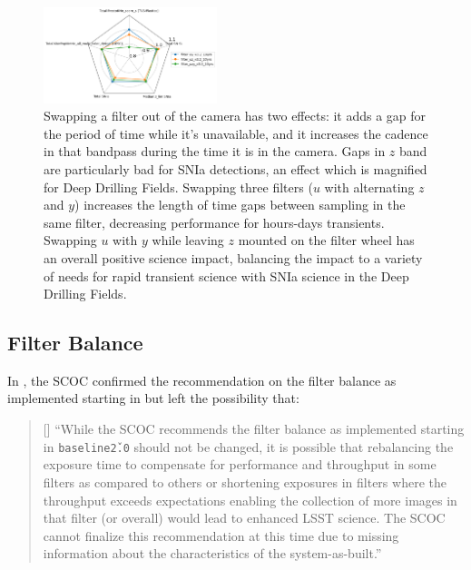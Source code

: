 \begin{figure}
\centering
\includegraphics[width=0.45\textwidth]{figures/filter_swap_KNe.png}
\caption{Swapping a filter out of the camera has two effects: it adds a gap for the period of time while it's unavailable, and it increases the cadence in that bandpass during the time it is in the camera. Gaps in $z$ band are particularly bad for SNIa detections, an effect which is magnified for Deep Drilling Fields. %
Swapping three filters ($u$ with alternating $z$ and $y$) increases the length of time gaps between sampling in the same filter, decreasing performance for hours-days transients.
Swapping $u$ with $y$ while leaving $z$ mounted on the filter wheel has an overall positive science impact, balancing the impact to a variety of needs for rapid transient science with SNIa science in the Deep Drilling Fields. }
\label{fig:swapping}
\end{figure}

\FloatBarrier
\subsection{Filter Balance}\label{sec:filterbalance}
 In , the SCOC confirmed the recommendation on the filter balance as implemented starting in  but left the possibility that:
  
 \begin{quote}[] ``While the SCOC recommends the filter balance as implemented starting in \texttt{baseline\v2.0} should not be changed, it is possible that rebalancing the
exposure time to compensate for performance and throughput in some filters as compared to others or shortening exposures in filters where the throughput exceeds expectations enabling the collection of more images in that filter (or overall) would lead to
enhanced LSST science. The SCOC cannot finalize this recommendation at this time due to
missing information about the characteristics of the system-as-built.''
\end{quote}

